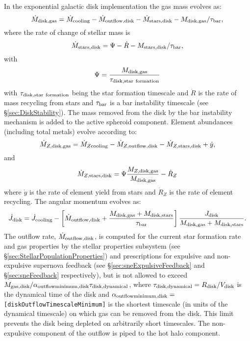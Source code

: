 In the exponential galactic disk implementation the gas mass evolves as:
\begin{equation}
 \dot{M}_{\rm disk, gas} = \dot{M}_{\rm cooling} - \dot{M}_{\rm outflow, disk} - \dot{M}_{\rm stars, disk} - M_{\rm disk, gas}/\tau_{\rm bar},
\end{equation}
where the rate of change of stellar mass is
\begin{equation}
 \dot{M}_{\rm stars, disk} = \Psi - \dot{R} - M_{\rm stars,disk}/\tau_{\rm bar},
\end{equation}
with
\begin{equation}
 \Psi = {M_{\rm disk, gas} \over \tau_{\rm disk, star~formation}}
\end{equation}
with $\tau_{\rm disk, star~formation}$ being the star formation timescale and $\dot{R}$ is the rate of mass recycling from stars and $\tau_{\rm bar}$ is a bar instability timescale (see \S\ref{sec:DiskStability}). The mass removed from the disk by the bar instability mechanism is added to the active spheroid component.
Element abundances (including total metals) evolve according to:
\begin{equation}
  \dot{M}_{Z, {\rm disk, gas}} = \dot{M}_{Z {\rm cooling}} - \dot{M}_{Z, {\rm outflow, disk}} - \dot{M}_{Z, {\rm stars, disk}} + \dot{y},
\end{equation}
and
\begin{equation}
 \dot{M}_{Z, {\rm stars, disk}} = \Psi {M_{Z, {\rm disk, gas}} \over M_{\rm disk, gas}} - \dot{R}_Z
\end{equation}
where $\dot{y}$ is the rate of element yield from stars and $\dot{R}_Z$ is the rate of element recycling. The angular momentum evolves as:
\begin{equation}
 \dot{J}_{\rm disk} = \dot{J}_{\rm cooling} - \left[ \dot{M}_{\rm outflow, disk} + {M_{\rm disk, gas}  + M_{\rm disk, stars} \over \tau_{\rm bar}}\right] {J_{\rm disk} \over M_{\rm disk, gas} + M_{\rm disk, stars}}.
\end{equation}
The outflow rate, $\dot{M}_{\rm outflow, disk}$, is computed for the current star formation rate and gas properties by the stellar properties subsystem (see \S\ref{sec:StellarPopulationProperties}) and prescriptions for expulsive and non-expulsive supernova feedback (see \S\ref{sec:sneExpulsiveFeedback} and \S\ref{sec:sneFeedback} respectively), but is not allowed to exceed $M_{\rm gas, disk}/ \alpha_{\rm outflow minimum, disk} \tau_{\rm disk, dynamical}$, where $\tau_{\rm disk, dynamical}=R_{\rm disk}/V_{\rm disk}$ is the dynamical time of the disk and $\alpha_{\rm outflow minimum, disk}=${\tt [diskOutflowTimescaleMinimum]} is the shortest timescale (in units of the dynamical timescale) on which gas can be removed from the disk. This limit prevents the disk being depleted on arbitrarily short timescales. The non-expulsive component of the outflow is piped to the hot halo component.

